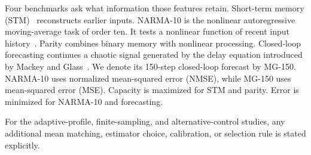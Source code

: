 Four benchmarks ask what information those features retain. Short-term memory
(STM)~\cite{JaegerSTM2001} reconstructs earlier inputs. NARMA-10
is the nonlinear autoregressive moving-average task of order ten. It tests a
nonlinear function of recent input history~\cite{AtiyaParlos2000}.
Parity combines binary memory with nonlinear processing. Closed-loop
forecasting continues a chaotic signal generated by the delay equation
introduced by Mackey and Glass~\cite{MackeyGlass1977}.
We denote its 150-step closed-loop forecast by MG-150. NARMA-10 uses
normalized mean-squared error (NMSE), while MG-150 uses mean-squared error
(MSE).
Capacity is maximized for STM and parity. Error is minimized for NARMA-10 and
forecasting.

For the adaptive-profile, finite-sampling, and alternative-control studies,
any additional mean matching, estimator choice, calibration, or selection
rule is stated explicitly.

